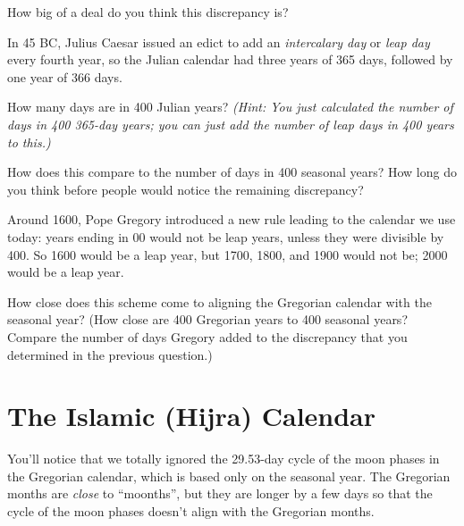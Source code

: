 \documentclass[11pt]{article}
\begin{document}
How big of a deal do you think this discrepancy is? 

\vspace{1in}

	\underline{\hspace{6in}}

In 45 BC, Julius Caesar issued an edict to add an {\it intercalary day} or {\it leap day} every fourth year, so the Julian calendar had three years of 365 days, followed by one year of 366 days.

How many days are in 400 Julian years? {\it (Hint: You just calculated the number of days in 400 365-day years; you can just add the number of leap days in 400 years to this.)}

\vspace{1in}

\underline{\hspace{6in}}

How does this compare to the number of days in 400 seasonal years? How long do you think before people would notice the remaining discrepancy?

\vspace{1in}
\underline{\hspace{6in}}

Around 1600, Pope Gregory introduced a new rule leading to the calendar we use today: years ending in 00 would not be leap years, unless they were divisible by 400. So 1600 would be a leap year, but 1700, 1800, and 1900 would not be; 2000 would be a leap year.

How close does this scheme come to aligning the Gregorian calendar with the seasonal year? (How close are 400 Gregorian years to 400 seasonal years? Compare the number of days Gregory added to the discrepancy that you determined in the previous question.)


\vspace{1in}
\underline{\hspace{6in}}

\section{The Islamic (Hijra) Calendar}

You'll notice that we totally ignored the 29.53-day cycle of the moon phases in the Gregorian calendar, which is based only on the seasonal year. The Gregorian months are {\it close} to ``moonths'', but they are longer by a few days so that the cycle of the moon phases doesn't align with the Gregorian months.
\end{document}
